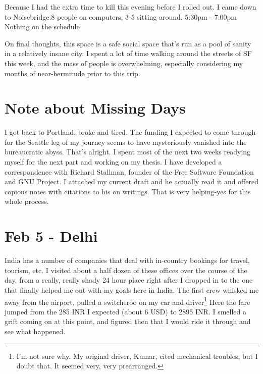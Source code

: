 \documentclass[11pt]{amsart}
\begin{document}
Because I had the extra time to kill this evening before I rolled out. I came down to Noisebridge.8 people on computers, 3-5 sitting around. 5:30pm - 7:00pm Nothing on the schedule

On final thoughts, this space is a safe social space that's run as a pool of sanity in a relatively insane city. I spent a lot of time walking around the streets of SF this week, and the mass of people is overwhelming, especially considering my months of near-hermitude prior to this trip.

\section{Note about Missing Days}

I got back to Portland, broke and tired. The funding I expected to come through for the Seattle leg of my journey seems to have mysteriously vanished into the bureaucratic abyss. That's alright. I spent most of the next two weeks readying myself for the next part and working on my thesis. I have developed a correspondence with Richard Stallman, founder of the Free Software Foundation and GNU Project. I attached my current draft and he actually read it and offered copious notes with citations to his on writings. That is very helping-yes for this whole process.

\section{Feb 5 - Delhi}

India has a number of companies that deal with in-country bookings for travel, tourism, etc. I visited about a half dozen of these offices over the course of the day, from a really, really shady 24 hour place right after I dropped in to the one that finally helped me out with my goals here in India. The first crew whisked me away from the airport, pulled a switcheroo on my car and driver\footnote{I'm not sure why. My original driver, Kumar, cited mechanical troubles, but I doubt that. It seemed very, very prearranged.} Here the fare jumped from the 285 INR I expected (about 6 USD) to 2895 INR. I smelled a grift coming on at this point, and figured then that I would ride it through and see what happened.
\end{document}
